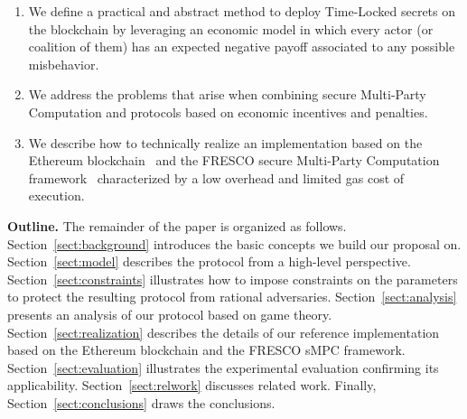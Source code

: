 \begin{enumerate}

	\smallskip
 	\item We define a practical and abstract method to deploy Time-Locked secrets on the blockchain by leveraging an economic model in which every actor (or coalition of them) has an expected negative payoff associated to any possible misbehavior.
 	
 	\smallskip
 	\item We address the problems that arise when combining secure Multi-Party Computation and protocols based on economic incentives and penalties. 
  
  	\smallskip
 	\item We describe how to technically realize an implementation based on the Ethereum blockchain~\cite{wood2014ethereum} and the FRESCO secure Multi-Party Computation framework~\cite{damgaard2016mpc} characterized by a low overhead and limited gas cost of execution.

\end{enumerate}


\medskip\textbf{Outline.} The remainder of the paper is organized as follows.
%
Section~\ref{sect:background} introduces the basic concepts we build our proposal on. 
%
Section~\ref{sect:model} describes the \shortname protocol from a high-level perspective.
%
Section~\ref{sect:constraints} illustrates how to impose constraints on the parameters to protect the resulting protocol from rational adversaries.
%
Section~\ref{sect:analysis} presents an analysis of our protocol based on game theory.
%
Section~\ref{sect:realization} describes the details of our reference implementation based on the Ethereum blockchain and the FRESCO sMPC framework.
%
Section~\ref{sect:evaluation} illustrates the experimental evaluation confirming its applicability.
%
Section~\ref{sect:relwork} discusses related work.
%
Finally, Section~\ref{sect:conclusions} draws the conclusions.
